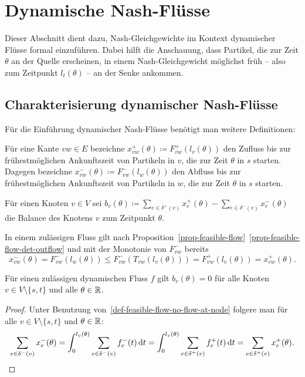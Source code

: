 \chapter{Dynamische Nash-Flüsse}\label{chapter-nash-flows}

Dieser Abschnitt dient dazu, Nash-Gleichgewichte im Kontext dynamischer Flüsse formal einzuführen.
Dabei hilft die Anschauung, dass Partikel, die zur Zeit $\theta$ an der Quelle erscheinen, in einem Nash-Gleichgewicht möglichst früh -- also zum Zeitpunkt $l_t(\theta)$ -- an der Senke ankommen.

\section{Charakterisierung dynamischer Nash-Flüsse}


Für die Einführung dynamischer Nash-Flüsse benötigt man weitere Definitionen: 

\begin{definition}
	Für eine Kante $vw\in E$ bezeichne $x_{vw}^+(\theta)\coloneq F_{vw}^+(l_v(\theta))$ den Zufluss bis zur frühestmöglichen Ankunftszeit von Partikeln in $v$, die zur Zeit $\theta$ in $s$ starten.\\
	Dagegen bezeichne $x_{vw}^-(\theta)\coloneq F^-_{vw}(l_w(\theta))$ den Abfluss bis zur frühestmöglichen Ankunftszeit von Partikeln in $w$, die zur Zeit $\theta$ in $s$ starten.
	
	Für einen Knoten $v\in V$ sei $b_v(\theta)\coloneq \sum_{e\in\delta^+(v)} x_e^+(\theta) - \sum_{e\in\delta^-(v)} x_e^-(\theta)$ die Balance des Knotens $v$ zum Zeitpunkt $\theta$.
\end{definition}

\begin{remark}\label{remark-x^-leqx^+}
	In einem zulässigen Fluss gilt nach Proposition~\ref{prop-feasible-flow}~\ref{prop-feasible-flow-det-outflow} und mit der Monotonie von $F_{vw}^-$ bereits 
	\[
	x_{vw}^-(\theta) = F_{vw}^-(l_w(\theta)) \leq F_{vw}^-(T_{vw}(l_v(\theta)))=F_{vw}^+(l_v(\theta)) = x_{vw}^+(\theta).
	\]
\end{remark}

\begin{lemma}\label{lemma-balance-0}
	Für einen zulässigen dynamischen Fluss $f$ gilt $b_v(\theta)=0$ für alle Knoten $v\in V\setminus\{ s,t \}$ und alle $\theta\in\mathbb{R}$.
\end{lemma}
\begin{proof}
	Unter Benutzung von~\ref{def-feasible-flow-no-flow-at-node} folgere man für alle $v\in V\setminus \{ s, t\}$ und $\theta\in\mathbb{R}$:
	\[ \sum_{e\in\delta^-(v)} x_e^-(\theta) = \int_{0}^{l_v(\theta)} \sum_{e\in\delta^-(v)} f_e^-(t) \mathop{}\!\mathrm{d} t = \int_{0}^{l_v(\theta)} \sum_{e\in\delta^+(v)} f_e^+(t) \mathop{}\!\mathrm{d} t = \sum_{e\in\delta^+(v)}x_e^+(\theta). \]
\end{proof}

